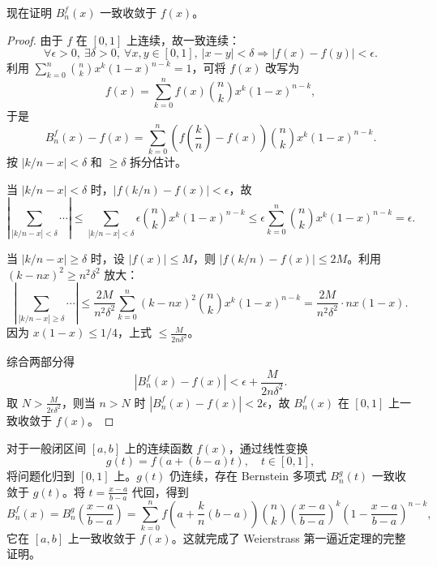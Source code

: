现在证明 $B_n^f(x)$ 一致收敛于 $f(x)$。

\begin{proof}
由于 $f$ 在 $[0,1]$ 上连续，故一致连续：
\[
\forall \epsilon>0,\ \exists\delta>0,\ \forall x,y\in[0,1],\ |x-y|<\delta \Rightarrow |f(x)-f(y)|<\epsilon.
\]
利用 $\sum_{k=0}^{n} \binom{n}{k} x^k (1-x)^{n-k} = 1$，可将 $f(x)$ 改写为
\[
f(x) = \sum_{k=0}^{n} f(x) \binom{n}{k} x^k (1-x)^{n-k},
\]
于是
\[
B_n^f(x)-f(x) = \sum_{k=0}^{n} \left(f\left(\frac{k}{n}\right)-f(x)\right) \binom{n}{k} x^k (1-x)^{n-k}.
\]
按 $|k/n-x|<\delta$ 和 $\ge\delta$ 拆分估计。

当 $|k/n-x|<\delta$ 时，$|f(k/n)-f(x)|<\epsilon$，故
\[
\left|\sum_{|k/n-x|<\delta} \cdots \right|
\le \sum_{|k/n-x|<\delta} \epsilon \binom{n}{k} x^k (1-x)^{n-k}
\le \epsilon \sum_{k=0}^{n} \binom{n}{k} x^k (1-x)^{n-k} = \epsilon.
\]

当 $|k/n-x|\ge\delta$ 时，设 $|f(x)|\le M$，则 $|f(k/n)-f(x)|\le 2M$。利用 $(k-nx)^2 \ge n^2\delta^2$ 放大：
\[
\left|\sum_{|k/n-x|\ge\delta} \cdots \right|
\le \frac{2M}{n^2\delta^2} \sum_{k=0}^{n} (k-nx)^2 \binom{n}{k} x^k (1-x)^{n-k}
= \frac{2M}{n^2\delta^2}\cdot nx(1-x).
\]
因为 $x(1-x)\le 1/4$，上式 $\le \frac{M}{2n\delta^2}$。

综合两部分得
\[
|B_n^f(x)-f(x)| < \epsilon + \frac{M}{2n\delta^2}.
\]
取 $N > \frac{M}{2\epsilon\delta^2}$，则当 $n>N$ 时 $|B_n^f(x)-f(x)| < 2\epsilon$，故 $B_n^f(x)$ 在 $[0,1]$ 上一致收敛于 $f(x)$。
\end{proof}

对于一般闭区间 $[a,b]$ 上的连续函数 $f(x)$，通过线性变换
\[
g(t) = f(a+(b-a)t),\quad t\in[0,1],
\]
将问题化归到 $[0,1]$ 上。$g(t)$ 仍连续，存在 Bernstein 多项式 $B_n^g(t)$ 一致收敛于 $g(t)$。将 $t=\frac{x-a}{b-a}$ 代回，得到
\[
B_n^f(x) = B_n^g\!\left( \frac{x-a}{b-a} \right)
= \sum_{k=0}^{n} f\!\left( a+\frac{k}{n}(b-a) \right)
\binom{n}{k} \left( \frac{x-a}{b-a} \right)^{\!k}
\left( 1-\frac{x-a}{b-a} \right)^{\!n-k},
\]
它在 $[a,b]$ 上一致收敛于 $f(x)$。这就完成了 Weierstrass 第一逼近定理的完整证明。
